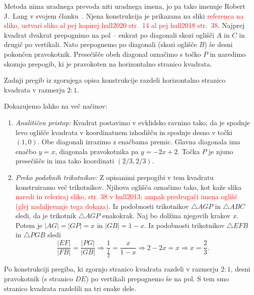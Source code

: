 Metoda nima uradnega prevoda niti uradnega imena, jo pa tako imenuje Robert J.\ Lang v svojem članku~\cite{lang1988}. Njena konstrukcija je prikazana na sliki \textcolor{red}{referenca na sliko, ustvari sliko al pej kopirej hull2020 str.\ 14 al pej hull2018 str.\ 38}. Najprej kvadrat dvakrat prepognimo na pol -- enkrat po diagonali skozi oglišči $A$ in $C$ in drugič po vertikali. Nato prepognemo po diagonali (skozi oglišče $B$) še desni pokončen pravokotnik. Presečišče obeh diagonal označimo s točko $P$ in naredimo skoznjo prepogib, ki je pravokoten na horizontalno stranico kvadrata.

\begin{trditev}
    \label{trd:kriz_diag_3}
    Zadnji pregib iz zgornjega opisa konstrukcije razdeli horizontalno stranico kvadrata v razmerju $2:1$.
\end{trditev}

\begin{dokaz}
    Dokazujemo lahko na več načinov:
    \begin{enumerate}
        \item \textit{Analitičen pristop:} Kvadrat postavimo v evklidsko ravnino tako, da je spodnje levo oglišče kvadrata v koordinatnem izhodišču in spodnje desno v točki $(1, 0)$. Obe diagonali izrazimo z enačbama premic. Glavna diagonala ima enačbo $y = x$, diagonala pravokotnika pa $y = -2x + 2$. Točka $P$ je njuno presečišče in ima tako koordinati $(2/3, 2/3)$.
        \item \textit{Preko podobnih trikotnikov:} Z opisanimi prepogibi v tem kvadratu konstruiramo več trikotnikov. Njihova oglišča označimo tako, kot kaže slika \textcolor{red}{naredi in referiraj sliko, str. 38 v hull2013; ampak predrugači imena oglišč (glej nadaljevanje tega dokaza)}. Iz podobnosti trikotnikov $\triangle AGP$ in $\triangle ABC$ sledi, da je trikotnik $\triangle AGP$ enakokrak. Naj bo dolžina njegovih krakov $x$. Potem je $|AG| = |GP| = x$ in $|GB| = 1 - x$. Iz podobnosti trikotnikov $\triangle EFB$ in $\triangle PGB$ sledi
        $$ \frac{|EF|}{|FB|} = \frac{|PG|}{|GB|} \Rightarrow \frac{1}{\frac{1}{2}} = \frac{x}{1 - x} \Rightarrow 2 - 2x = x \Rightarrow x = \frac{2}{3}. $$
    \end{enumerate}
\end{dokaz}

Po konstrukciji pregiba, ki zgornjo stranico kvadrata razdeli v razmerju $2:1$, desni pravokotnik (s stranico $DE$) po vertikali prepognemo še na pol. S tem smo stranico kvadrata razdelili na tri enake dele.

